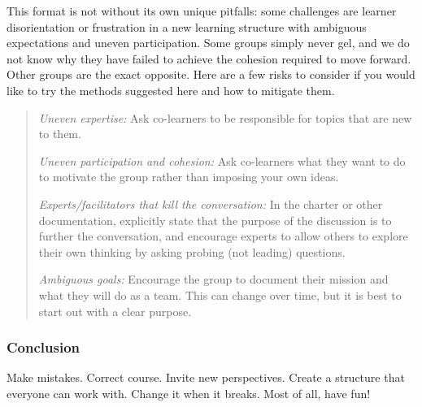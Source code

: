 This format is not without its own unique pitfalls: some challenges are
learner disorientation or frustration in a new learning structure with
ambiguous expectations and uneven participation. Some groups simply
never gel, and we do not know why they have failed to achieve the
cohesion required to move forward. Other groups are the exact opposite.
Here are a few risks to consider if you would like to try the methods
suggested here and how to mitigate them.

\begin{quote}
\emph{Uneven expertise:} Ask co-learners to be responsible for topics
that are new to them.

\emph{Uneven participation and cohesion:} Ask co-learners what they want
to do to motivate the group rather than imposing your own ideas.

\emph{Experts/facilitators that kill the conversation:} In the charter
or other documentation, explicitly state that the purpose of the
discussion is to further the conversation, and encourage experts to
allow others to explore their own thinking by asking probing (not
leading) questions.

\emph{Ambiguous goals:} Encourage the group to document their mission
and what they will do as a team. This can change over time, but it is
best to start out with a clear purpose.
\end{quote}

\subsubsection{Conclusion}\label{student-syllabus-conclusion}

Make mistakes. Correct course. Invite new perspectives. Create a
structure that everyone can work with. Change it when it breaks. Most of
all, have fun!
